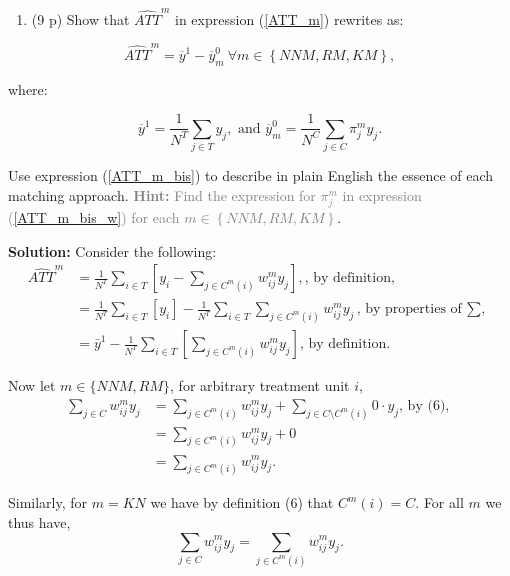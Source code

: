\documentclass[
]{article}
\providecommand{\tightlist}{%
  \setlength{\itemsep}{0pt}\setlength{\parskip}{0pt}}
\begin{document}
\begin{enumerate}
\def\labelenumi{\arabic{enumi}.}
\setcounter{enumi}{4}
\tightlist
\item
  (9 p) Show that \(\widehat{ATT}^{m}\) in expression (\ref{ATT_m})
  rewrites as:
\end{enumerate}

\begin{equation} \label{ATT_m_bis}
\widehat{ATT}^{m} =\overline{y}^{1}-\overline{y}_{m}^{0} \ \forall m\in \left\{ NNM,RM,KM\right\},
\end{equation}

\noindent where:

\begin{equation}\label{ATT_m_bis_w}
\overline{y}^{1} =\frac{1}{N^{T}}\sum_{j \in T}y_{j}, \text{     and      }  \overline{y}_{m}^{0} =\frac{1}{N^{C}}\sum_{j \in C}\pi_{j}^{m}y_{j}.
\end{equation}

\noindent Use expression (\ref{ATT_m_bis}) to describe in plain English
the essence of each matching approach.
\textcolor{gray}{\textbf{Hint:} Find the expression for $\pi _{j}^{m}$ in expression (\ref{ATT_m_bis_w}) for each $m\in \left\{NNM,RM,KM\right\} $}.

\textbf{Solution:} Consider the following: \begin{align*}
 \hat{ATT}^m &= \frac{1}{N^T} \sum_{i\in T}\left[y_i - \sum_{j\in C^m(i)} w_{ij}^m y_j\right], \text{, by definition, }\\
 &= \frac{1}{N^T} \sum_{i\in T}[y_i] - \frac{1}{N^T} \sum_{i\in T}\sum_{j\in C^m(i)} w_{ij}^m y_j \text{, by properties of $\sum$, }\\
 &= \bar{y}^1 - \frac{1}{N^T} \sum_{i\in T}\left[\sum_{j\in C^m(i)} w_{ij}^m y_j\right] \text{, by definition. }
\end{align*}

Now let \(m \in \{NNM, RM\}\), for arbitrary treatment unit \(i\),
\begin{align*}
    \sum_{j\in C}w_{ij}^m y_j &= \sum_{j\in C^m(i)} w_{ij}^m y_j + \sum_{j\in C\setminus C^m(i)} 0 \cdot y_j \text{, by (6), }\\
    &= \sum_{j\in C^m(i)} w_{ij}^m y_j + 0 \\
    &= \sum_{j\in C^m(i)} w_{ij}^m y_j.  
\end{align*}

Similarly, for \(m = KN\) we have by definition (6) that \(C^m(i) = C\).
For all \(m\) we thus have,
\[\sum_{j\in C}w_{ij}^m y_j = \sum_{j\in C^m(i)} w_{ij}^m y_j.\]
\end{document}
